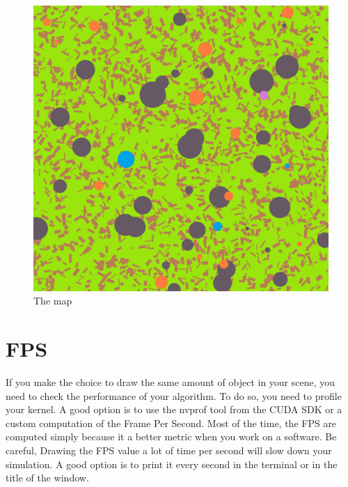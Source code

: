 \documentclass{article}
\begin{document}
\begin{figure}[H]
	\centering
	\includegraphics[scale=0.5]{figures/map.png}
	\caption{The map}
\end{figure}

\section{FPS}
If you make the choice to draw the same amount of object in your scene, you need to check the performance of your algorithm. To do so, you need to profile your kernel. A good option is to use the nvprof tool from the CUDA SDK or a custom computation of the Frame Per Second. Most of the time, the FPS are computed simply because it a better metric when you work on a software. Be careful, Drawing the FPS value a lot of time per second will slow down your simulation. A good option is to print it every second in the terminal or in the title of the window.
\end{document}
